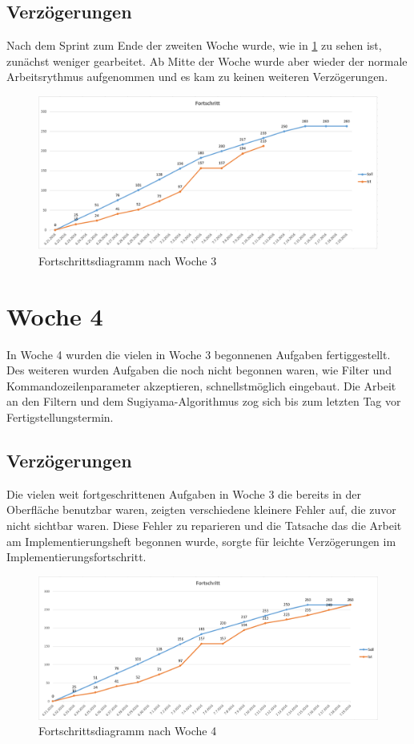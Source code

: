 \subsection{Verzögerungen}
Nach dem Sprint zum Ende der zweiten Woche wurde, wie in \ref{fig:week_three_diagram} zu sehen ist, zunächst weniger gearbeitet. Ab Mitte der Woche wurde aber wieder der normale Arbeitsrythmus aufgenommen und es kam zu keinen weiteren Verzögerungen.
\begin{figure}[!htbp]
	\centering
	\includegraphics[width=380pt]{resourcen/week_three_diagram.PNG}
	\caption{Fortschrittsdiagramm nach Woche 3}
	\label{fig:week_three_diagram}
\end{figure}

\newpage

\section{Woche 4}
In Woche 4 wurden die vielen in Woche 3 begonnenen Aufgaben fertiggestellt. Des weiteren wurden Aufgaben die noch nicht begonnen waren, wie Filter und Kommandozeilenparameter akzeptieren, schnellstmöglich eingebaut.
Die Arbeit an den Filtern und dem Sugiyama-Algorithmus zog sich bis zum letzten Tag vor Fertigstellungstermin.
\subsection{Verzögerungen}
Die vielen weit fortgeschrittenen Aufgaben in Woche 3 die bereits in der Oberfläche benutzbar waren, zeigten verschiedene kleinere Fehler auf, die zuvor nicht sichtbar waren. Diese Fehler zu reparieren und die Tatsache das die Arbeit am Implementierungsheft begonnen wurde, sorgte für leichte Verzögerungen im Implementierungsfortschritt.
\begin{figure}[!htbp]
	\centering
	\includegraphics[width=380pt]{resourcen/week_four_diagram.PNG}
	\caption{Fortschrittsdiagramm nach Woche 4}
	\label{fig:week_four_diagram}
\end{figure}

